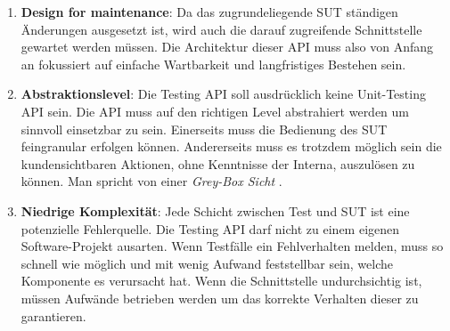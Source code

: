 \begin{enumerate}
\item \textbf{Design for maintenance}: Da das zugrundeliegende \Gls{SUT} ständigen Änderungen ausgesetzt ist, wird auch die darauf zugreifende Schnittstelle gewartet werden müssen. Die Architektur dieser API muss also von Anfang an fokussiert auf einfache Wartbarkeit und langfristiges Bestehen sein.
\item \textbf{Abstraktionslevel}: Die Testing API soll ausdrücklich keine Unit-Testing API sein. Die API muss auf den richtigen Level abstrahiert werden um sinnvoll einsetzbar zu sein. Einerseits muss die Bedienung des \Gls{SUT} feingranular erfolgen können. Andererseits muss es trotzdem möglich sein die kundensichtbaren Aktionen, ohne Kenntnisse der Interna, auszulösen zu können. Man spricht von einer \textit{Grey-Box Sicht} \cite{tyler_black-box_2004}.
\item \textbf{Niedrige Komplexität}: Jede Schicht zwischen Test und \Gls{SUT} ist eine potenzielle Fehlerquelle. Die Testing API darf nicht zu einem eigenen Software-Projekt ausarten. Wenn Testfälle ein Fehlverhalten melden, muss so schnell wie möglich und mit wenig Aufwand feststellbar sein, welche Komponente es verursacht hat. Wenn die Schnittstelle undurchsichtig ist, müssen Aufwände betrieben werden um das korrekte Verhalten dieser zu garantieren.
\end{enumerate}

